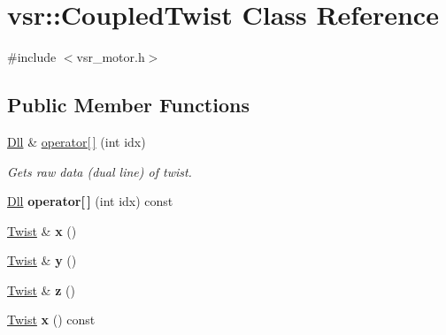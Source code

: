 \hypertarget{classvsr_1_1_coupled_twist}{\section{vsr\-:\-:Coupled\-Twist Class Reference}
\label{classvsr_1_1_coupled_twist}
}


{\ttfamily \#include $<$vsr\-\_\-motor.\-h$>$}

\subsection*{Public Member Functions}
\begin{DoxyCompactItemize}
\item 
\hypertarget{classvsr_1_1_coupled_twist_ad8011cb406b8b6adc8c76a659365eb34}{\hyperlink{namespacevsr_a6c6892b7aec25cfb16492501e2e35b11}{Dll} \& \hyperlink{classvsr_1_1_coupled_twist_ad8011cb406b8b6adc8c76a659365eb34}{operator\mbox{[}$\,$\mbox{]}} (int idx)}\label{classvsr_1_1_coupled_twist_ad8011cb406b8b6adc8c76a659365eb34}

\begin{DoxyCompactList}\small\item\em Gets raw data (dual line) of twist. \end{DoxyCompactList}\item 
\hypertarget{classvsr_1_1_coupled_twist_a3df7c06e476e9668b68202d8f4c6bc62}{\hyperlink{namespacevsr_a6c6892b7aec25cfb16492501e2e35b11}{Dll} {\bfseries operator\mbox{[}$\,$\mbox{]}} (int idx) const }\label{classvsr_1_1_coupled_twist_a3df7c06e476e9668b68202d8f4c6bc62}

\item 
\hypertarget{classvsr_1_1_coupled_twist_a6cabf1ef358e52d95fa129d6793b206f}{\hyperlink{classvsr_1_1_twist}{Twist} \& {\bfseries x} ()}\label{classvsr_1_1_coupled_twist_a6cabf1ef358e52d95fa129d6793b206f}

\item 
\hypertarget{classvsr_1_1_coupled_twist_a445d4a0e454988b9abe705e381986336}{\hyperlink{classvsr_1_1_twist}{Twist} \& {\bfseries y} ()}\label{classvsr_1_1_coupled_twist_a445d4a0e454988b9abe705e381986336}

\item 
\hypertarget{classvsr_1_1_coupled_twist_a4ce84562becc2901b45179eb1d57e141}{\hyperlink{classvsr_1_1_twist}{Twist} \& {\bfseries z} ()}\label{classvsr_1_1_coupled_twist_a4ce84562becc2901b45179eb1d57e141}

\item 
\hypertarget{classvsr_1_1_coupled_twist_ade93a1934f129bcb805f4f7ec8d3537a}{\hyperlink{classvsr_1_1_twist}{Twist} {\bfseries x} () const }\label{classvsr_1_1_coupled_twist_ade93a1934f129bcb805f4f7ec8d3537a}


\end{DoxyCompactItemize}
